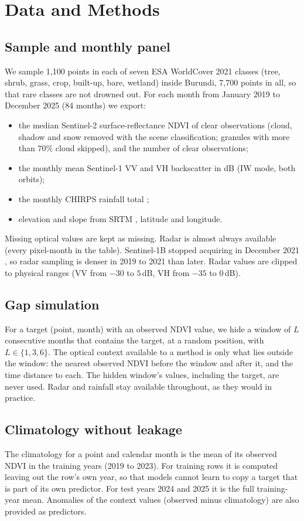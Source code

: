 \documentclass[conference]{IEEEtran}
\begin{document}
\section{Data and Methods}
\label{sec:method}

\subsection{Sample and monthly panel}
We sample 1{,}100 points in each of seven ESA WorldCover 2021 classes \cite{zanaga2022wc} (tree, shrub, grass, crop, built-up, bare, wetland) inside Burundi, 7{,}700 points in all, so that rare classes are not drowned out. For each month from January 2019 to December 2025 (84 months) we export:
\begin{itemize}
\item the median Sentinel-2 surface-reflectance NDVI of clear observations (cloud, shadow and snow removed with the scene classification; granules with more than 70\% cloud skipped), and the number of clear observations;
\item the monthly mean Sentinel-1 VV and VH backscatter in dB (IW mode, both orbits);
\item the monthly CHIRPS rainfall total \cite{funk2015chirps};
\item elevation and slope from SRTM \cite{farr2007srtm}, latitude and longitude.
\end{itemize}
Missing optical values are kept as missing. Radar is almost always available (every pixel-month in the table). Sentinel-1B stopped acquiring in December 2021 \cite{esa2022s1b}, so radar sampling is denser in 2019 to 2021 than later. Radar values are clipped to physical ranges (VV from $-30$ to $5$\,dB, VH from $-35$ to $0$\,dB).

\subsection{Gap simulation}
For a target (point, month) with an observed NDVI value, we hide a window of $L$ consecutive months that contains the target, at a random position, with $L\in\{1,3,6\}$. The optical context available to a method is only what lies outside the window: the nearest observed NDVI before the window and after it, and the time distance to each. The hidden window's values, including the target, are never used. Radar and rainfall stay available throughout, as they would in practice.

\subsection{Climatology without leakage}
The climatology for a point and calendar month is the mean of its observed NDVI in the training years (2019 to 2023). For training rows it is computed leaving out the row's own year, so that models cannot learn to copy a target that is part of its own predictor. For test years 2024 and 2025 it is the full training-year mean. Anomalies of the context values (observed minus climatology) are also provided as predictors.
\end{document}
